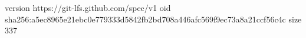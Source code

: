 version https://git-lfs.github.com/spec/v1
oid sha256:a5ec8965e21ebc0e779333d5842fb2bd708a446afc569f9ec73a8a21ccf56c4c
size 337
